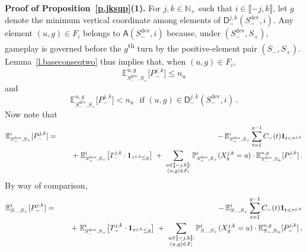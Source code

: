 \documentclass[letterpaper,11pt,oneside,reqno]{amsbook}
\newcommand{\PP}{\ensuremath{\mathbb{P}}}
\newcommand{\N}{\ensuremath{\mathbb{N}}}
\newcommand{\Z}{\ensuremath{\mathbb{Z}}}
\newcommand{\E}[0]{\mathbb{E}}
\numberwithin{figure}{chapter}
\theoremstyle{definition}
\theoremstyle{definition}
\theoremstyle{definition}
\theoremstyle{definition}
\theoremstyle{definition}
\newcommand{\intint}[1]{\llbracket 1,#1 \rrbracket}
\newcommand{\nwithoutzero}{\N_+}
\newcommand\pgameplay[3]{\PP^{#3}_{#1,#2}}
\newcommand\egameplay[3]{\E^{#3}_{#1,#2}}
\newcommand{\access}{\mathsf{A}}
\newcommand{\sdev}{S_-^{\textrm{dev}}}
\begin{document}
 {\bf Proof of Proposition~\ref{p.jksup}(1).}
 For $j,k \in \nwithoutzero$ such that $i \in \llbracket -j,k \rrbracket$, let $g$ denote the minimum vertical coordinate among elements of $\mathsf{D}_-^{j,k}(\sdev,i)$. 
 Any element $(u,g) \in F_i$ belongs to $\access(\sdev,i)$
 because, under $(\sdev,S_+)$, gameplay is governed before the $g$\textsuperscript{th} turn by the positive-element pair $(S_-,S_+)$. 
  Lemma~\ref{l.baseconseqtwo}
 thus implies that, when $(u,g) \in F_i$, 
 \begin{equation}\label{e.starone}
\E^{u,g}_{\sdev,S_+} \big[ P^{j,k}_- \big]  \leq n_u 
 \end{equation}
 and 
 \begin{equation}\label{e.startwo}
 \E^{u,g}_{\sdev,S_+} \big[ P^{j,k}_- \big] < n_u \, \, \, \, \textrm{if $(u,g) \in \mathsf{D}_-^{j,k}(\sdev,i)$} \, .
 \end{equation}
 Now note that
 \begin{eqnarray*}
 \egameplay{\sdev}{S_+}{i} [P_-^{j,k}] & = & - \,
 \egameplay{\sdev}{S_+}{i} \sum_{t=1}^{g-1} C_-(t)  {\bf 1}_{t < \tau^{j,k}} \\
   & &  \quad  \,\, + \,\, 
 \egameplay{\sdev}{S_+}{i} \big[T_-^{j,k} \cdot {\bf 1}_{\tau^{j,k} \leq g}\big]   \,\, + \,\,  \sum_{\substack{u \in \llbracket -j,k \rrbracket : \\ (u,g) \in F_i}}  \pgameplay{\sdev}{S_+}{i} (X^{j,k}_g = u) \cdot 
 \egameplay{\sdev}{S_+}{u,g} [P_-^{j,k}] \, .
 \end{eqnarray*}
 By way of comparison,
 \begin{eqnarray*}
 \egameplay{S_-}{S_+}{i} [P_-^{j,k}] & = & - \,
 \egameplay{S_-}{S_+}{i} \sum_{t=1}^{g-1} C_-(t)  {\bf 1}_{t < \tau^{j,k}} \\
 & & \quad   \, \, + \, \, 
 \egameplay{\sdev}{S_+}{i} \big[T_-^{j,k} \cdot {\bf 1}_{\tau^{j,k} \leq g}\big] 
  \, \, + \, \,  \sum_{\substack{u \in \llbracket -j,k \rrbracket : \\ (u,g) \in F_i}}  
 \pgameplay{S_-}{S_+}{i} (X^{j,k}_g = u) \cdot 
 \egameplay{S_-}{S_+}{u,g} [P_-^{j,k}] \, ,
 \end{eqnarray*}
\end{document}
